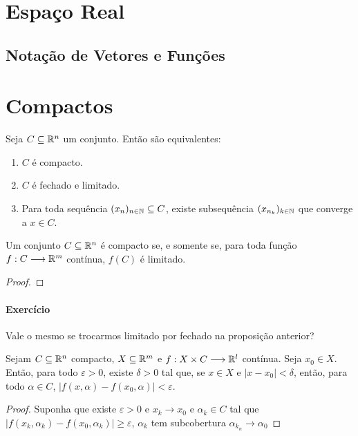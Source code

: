 \section{Espaço Real}

\subsection{Notação de Vetores e Funções}

\section{Compactos}

\begin{teo}
	Seja $C \subseteq \mathbb{R}^n$ um conjunto. Então são equivalentes:
	\begin{enumerate}
	\item $C$ é compacto.
	\item $C$ é fechado e limitado.
	\item Para toda sequência $(x_n)_{n \in \mathbb{N}} \subseteq C$, existe subsequência $(x_{n_k})_{k \in \mathbb{N}}$ que converge a $x \in C$.
	\end{enumerate}
\end{teo}

\begin{prop}
Um conjunto $C \subseteq \mathbb{R}^n$ é compacto se, e somente se, para toda função $f: C \longrightarrow \mathbb{R}^m$ contínua, $f(C)$ é limitado.
\end{prop}
\begin{proof}

\end{proof}

\paragraph*{Exercício} Vale o mesmo se trocarmos limitado por fechado na proposição anterior?

\begin{prop}
	Sejam $C \subseteq \mathbb{R}^n$ compacto, $X \subseteq \mathbb{R}^m$ e $f: X \times C \longrightarrow \mathbb{R}^l$ contínua. Seja $x_0 \in X$. Então, para todo $\varepsilon > 0$, existe $\delta > 0$ tal que, se $x \in X$ e $|x-x_0| < \delta$, então, para todo $\alpha \in C$, $|f(x,\alpha)-f(x_0,\alpha)|<\varepsilon$.
\end{prop}
\begin{proof}
	Suponha que existe $\varepsilon>0$ e $x_k \to x_0$ e $\alpha_k \in C$ tal que $|f(x_k,\alpha_k)-f(x_0, \alpha_k)| \geq \varepsilon$, $\alpha_k$ tem subcobertura $\alpha_{k_n} \to \alpha_0$
\end{proof}











